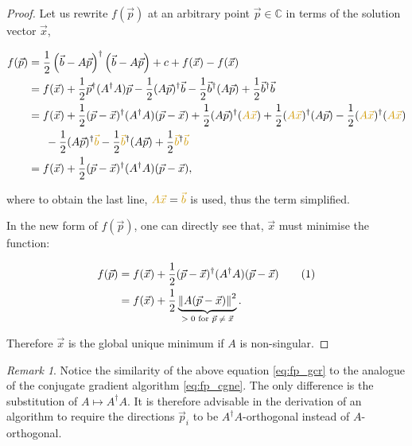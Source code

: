 \documentclass{article}
\newcommand\numberthis{\addtocounter{equation}{1}\tag{\theequation}}
\theoremstyle{plain} %
\theoremstyle{convention} %
\theoremstyle{remark} %
\newtheorem*{remark}{Remark} %
\numberwithin{equation}{section}
\begin{document}
\begin{proof}
Let us rewrite $f(\vec{p})$ at an arbitrary point $\vec{p} \in \mathbb{C}$ in terms of the solution vector $\vec{x}$,

\begin{align*}
    f(\vec{p}) &= \frac{1}{2} \left( \vec{b} - A \vec{p} \right)^{\dagger} \left( \vec{b} - A \vec{p} \right) + c + f(\vec{x}) - f(\vec{x}) \\
    &= f(\vec{x}) + \frac{1}{2} \vec{p}^{\dagger} (A^{\dagger} A) \vec{p} - \frac{1}{2} (A \vec{p})^{\dagger} \vec{b} - \frac{1}{2} \vec{b}^{\dagger} (A \vec{p}) + \frac{1}{2} \vec{b}^{\dagger} \vec{b} \\
    &= f(\vec{x}) + \frac{1}{2} (\vec{p} - \vec{x})^{\dagger} (A^{\dagger} A) (\vec{p} - \vec{x}) + \frac{1}{2} (A \vec{p})^{\dagger} (\textcolor{cyellow}{A \vec{x}}) + \frac{1}{2} (\textcolor{cyellow}{A \vec{x}})^{\dagger} (A \vec{p}) - \frac{1}{2} (\textcolor{cyellow}{A \vec{x}})^{\dagger} (\textcolor{cyellow}{A \vec{x}}) \\
    &\phantom{==} - \frac{1}{2} (A \vec{p})^{\dagger} \textcolor{cyellow}{\vec{b}} - \frac{1}{2} \textcolor{cyellow}{\vec{b}}^{\dagger} (A \vec{p}) + \frac{1}{2} \textcolor{cyellow}{\vec{b}}^{\dagger} \textcolor{cyellow}{\vec{b}} \\
    &= f(\vec{x}) + \frac{1}{2} (\vec{p} - \vec{x})^{\dagger} (A^{\dagger} A) (\vec{p} - \vec{x}), \\
\end{align*}

where to obtain the last line, $\textcolor{cyellow}{A \vec{x}} = \textcolor{cyellow}{\vec{b}}$ is used, thus the term simplified.

In the new form of $f(\vec{p})$, one can directly see that, $\vec{x}$ must minimise the function:

\begin{align*}
    f(\vec{p}) &= f(\vec{x}) + \frac{1}{2} (\vec{p} - \vec{x})^{\dagger} (A^{\dagger} A) (\vec{p} - \vec{x}) \numberthis \label{eq:fp_gcr} \\
    &= f(\vec{x}) + \frac{1}{2} \underbrace{ \norm{ A (\vec{p} - \vec{x})}^2 }_{\text{$> 0$ for $\vec{p} \neq \vec{x}$}}.
\end{align*}

Therefore $\vec{x}$ is the global unique minimum if $A$ is non-singular.

\end{proof}

\begin{remark}
Notice the similarity of the above equation \eqref{eq:fp_gcr} to the analogue of the conjugate gradient algorithm \eqref{eq:fp_cgne}. The only difference is the substitution of $A \longmapsto A^{\dagger} A$. It is therefore advisable in the derivation of an algorithm to require the directions $\vec{p}_i$ to be $A^{\dagger} A$-orthogonal instead of $A$-orthogonal.
\end{remark}
\end{document}
